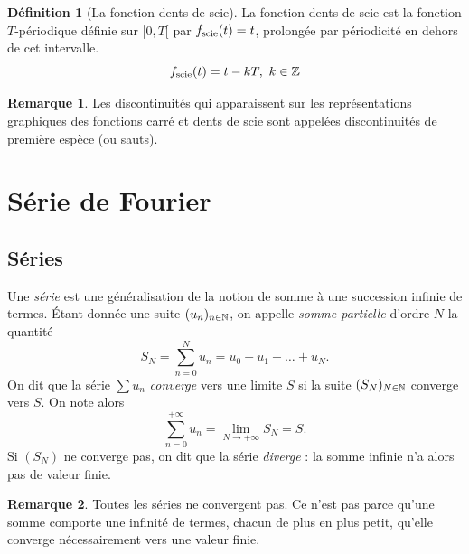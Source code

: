 \documentclass[a4paper,11pt]{article}
\theoremstyle{definition}
\newtheorem{definition}{Définition}[section]
\newtheorem{remark}{Remarque}[section]
\newcommand{\highlight}[1]{{\color{niceblue}\emph{#1}}}
\begin{document}
\begin{definition}[La fonction dents de scie]

    La fonction dents de scie est la fonction $T$-périodique définie sur $[0,T[$ par $f_{\rm scie}(t) = t$, prolongée par périodicité en dehors de cet intervalle.
    $$
    f_{\rm scie}(t) = t - kT ,\ k\in{\mathbb{Z}}
    $$
\end{definition}

\begin{center}
\end{center}

\begin{remark}
    Les discontinuités qui apparaissent sur les représentations graphiques des fonctions carré et dents de scie sont appelées discontinuités de première espèce (ou sauts).
\end{remark}



\section{Série de Fourier}

\subsection{Séries}

Une \highlight{série} est une généralisation de la notion de somme à une succession infinie de termes. Étant donnée une suite $(u_n)_{n\in{\mathbb{N}}}$, on appelle \highlight{somme partielle} d'ordre $N$ la quantité
$$
    S_N = \sum_{n=0}^{N} u_n = u_0 + u_1 + \dots + u_N.
$$
On dit que la série $\sum u_n$ \highlight{converge} vers une limite $S$ si la suite $(S_N)_{N\in{\mathbb{N}}}$ converge vers $S$. On note alors
$$
    \sum_{n=0}^{+\infty} u_n = \lim_{N\to+\infty} S_N = S.
$$
Si $(S_N)$ ne converge pas, on dit que la série \highlight{diverge} : la somme infinie n'a alors pas de valeur finie.

\begin{remark}
    Toutes les séries ne convergent pas. Ce n'est pas parce qu'une somme comporte une infinité de termes, chacun de plus en plus petit, qu'elle converge nécessairement vers une valeur finie.
\end{remark}
\end{document}
